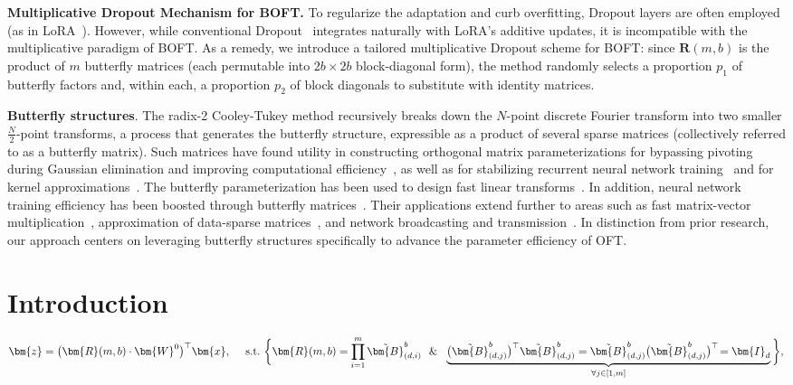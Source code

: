 \textbf{Multiplicative Dropout Mechanism for BOFT.} To regularize the adaptation and curb overfitting, Dropout layers are often employed (as in LoRA~\cite{hulora2022}). However, while conventional Dropout~\cite{srivastava2014dropout} integrates naturally with LoRA's additive updates, it is incompatible with the multiplicative paradigm of BOFT. As a remedy, we introduce a tailored multiplicative Dropout scheme for BOFT: since $\bm{R}(m,b)$ is the product of $m$ butterfly matrices (each permutable into $2b\times2b$ block-diagonal form), the method randomly selects a proportion $p_1$ of butterfly factors and, within each, a proportion $p_2$ of block diagonals to substitute with identity matrices.

\textbf{Butterfly structures}. The radix-2 Cooley-Tukey method recursively breaks down the $N$-point discrete Fourier transform into two smaller $\frac{N}{2}$-point transforms, a process that generates the butterfly structure, expressible as a product of several sparse matrices (collectively referred to as a butterfly matrix). Such matrices have found utility in constructing orthogonal matrix parameterizations for bypassing pivoting during Gaussian elimination and improving computational efficiency~\cite{parker1995random}, as well as for stabilizing recurrent neural network training~\cite{jing2017tunable} and for kernel approximations~\cite{munkhoeva2018quadrature}. The butterfly parameterization has been used to design fast linear transforms~\cite{dao2019learning,dao2019kaleidoscope}. In addition, neural network training efficiency has been boosted through butterfly matrices~\cite{chen2022pixelated,dao2022monarch}. Their applications extend further to areas such as fast matrix-vector multiplication~\cite{michielssen1996multilevel,o2010algorithm}, approximation of data-sparse matrices~\cite{li2015butterfly}, and network broadcasting and transmission~\cite{klasing1994broadcasting,li2003linear,rajasingh2016transmission}. In distinction from prior research, our approach centers on leveraging butterfly structures specifically to advance the parameter efficiency of OFT.

\section{Introduction}

\begin{equation}
    \begin{aligned}\nonumber
    \bm{z}=\big(\bm{R}(m,b)\cdot\bm{W}^0\big)^\top\bm{x},~~~~\text{s.t.}~\bigg{\{}\bm{R}(m,b)=\prod_{i=1}^m \tilde{\bm{B}}^b_{(d,i)}~~\&~~\underbrace{\big(\tilde{\bm{B}}^b_{(d,j)}\big)^\top\tilde{\bm{B}}^b_{(d,j)}=\tilde{\bm{B}}^b_{(d,j)}\big(\tilde{\bm{B}}^b_{(d,j)}\big)^\top\!=\bm{I}_d}_{\forall j\in [1, m]}\bigg{\}},
    \end{aligned}
\end{equation}